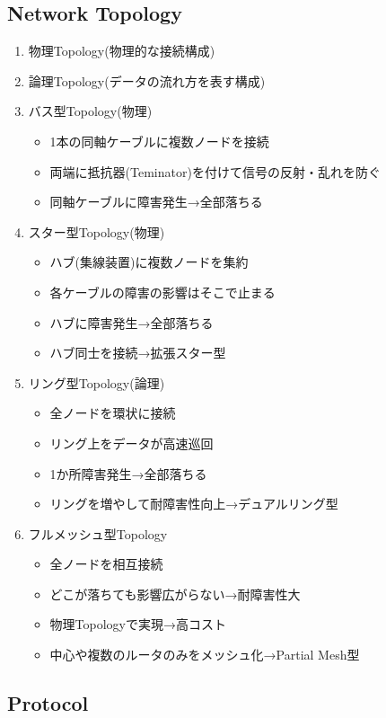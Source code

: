 \subsection{Network Topology}
\begin{enumerate}
    \item 物理Topology(物理的な接続構成)
    \item 論理Topology(データの流れ方を表す構成)
    \item バス型Topology(物理)
    \begin{itemize}
        \item 1本の同軸ケーブルに複数ノードを接続
        \item 両端に抵抗器(Teminator)を付けて信号の反射・乱れを防ぐ
        \item 同軸ケーブルに障害発生→全部落ちる
    \end{itemize}
    \item スター型Topology(物理)
    \begin{itemize}
        \item ハブ(集線装置)に複数ノードを集約
        \item 各ケーブルの障害の影響はそこで止まる
        \item ハブに障害発生→全部落ちる
        \item ハブ同士を接続→拡張スター型
    \end{itemize}
    \item リング型Topology(論理)
    \begin{itemize}
        \item 全ノードを環状に接続
        \item リング上をデータが高速巡回
        \item 1か所障害発生→全部落ちる
        \item リングを増やして耐障害性向上→デュアルリング型
    \end{itemize}
    \item フルメッシュ型Topology
    \begin{itemize}
        \item 全ノードを相互接続
        \item どこが落ちても影響広がらない→耐障害性大
        \item 物理Topologyで実現→高コスト
        \item 中心や複数のルータのみをメッシュ化→Partial Mesh型
    \end{itemize}
\end{enumerate}

\subsection{Protocol}